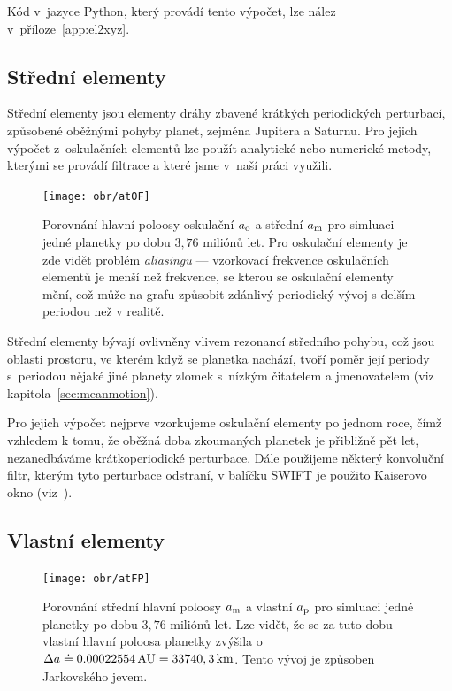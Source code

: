 \documentclass[A4paper, 12pt, oneside]{book}
\newcommand{\I}[1]{\textit{#1}}
\begin{document}
Kód v~jazyce Python, který provádí tento výpočet, lze nález v~příloze~\ref{app:el2xyz}.

\subsection{Střední elementy}
Střední elementy jsou elementy dráhy zbavené krátkých periodických perturbací, způsobené oběžnými pohyby planet, zejména Jupitera a Saturnu. Pro jejich výpočet z~oskulačních elementů lze použít analytické nebo numerické metody, kterými se provádí filtrace a které jsme v~naší práci využili. 

\begin{figure}
	\centering
	\texttt{[image: obr/atOF]}
	\caption{Porovnání hlavní poloosy oskulační $a_{\rm o}$ a střední $a_{\rm m}$ pro simluaci jedné planetky po dobu $3,76$ miliónů let. Pro oskulační elementy je zde vidět problém \I{aliasingu} --- vzorkovací frekvence oskulačních elementů je menší než frekvence, se kterou se oskulační elementy mění, což může na grafu způsobit zdánlivý periodický vývoj s delším periodou než v realitě.} 
	\label{atOF}
\end{figure}

Střední elementy bývají ovlivněny vlivem rezonancí středního pohybu, což jsou oblasti prostoru, ve kterém když se planetka nachází, tvoří poměr její periody s~periodou nějaké jiné planety zlomek s~nízkým čitatelem a jmenovatelem (viz kapitola~\ref{sec:meanmotion}). 

Pro jejich výpočet nejprve vzorkujeme oskulační elementy po jednom roce, čímž vzhledem k tomu, že oběžná doba zkoumaných planetek je přibližně pět let, nezanedbáváme krátkoperiodické perturbace. Dále použijeme některý konvoluční filtr, kterým tyto perturbace odstraní, v balíčku SWIFT je použito Kaiserovo okno (viz~\cite{quinn91}).

\subsection{Vlastní elementy}

\begin{figure}[!htb]
	\centering
	\texttt{[image: obr/atFP]}
	\caption{Porovnání střední hlavní poloosy $a_{\rm m}$ a vlastní $a_{\rm p}$ pro simluaci jedné planetky po dobu $3,76$ miliónů let. Lze vidět, že se za tuto dobu vlastní hlavní poloosa planetky zvýšila o~$\Delta a\doteq0.00022554\,{\rm AU}=33740,3\, {\rm km}$. Tento vývoj je způsoben Jarkovského jevem.}
	\label{atFP}
\end{figure}
\end{document}
